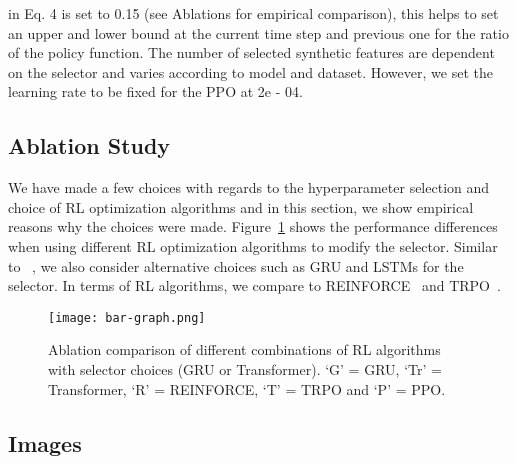 \documentclass[10pt,twocolumn,letterpaper]{article}
\begin{document}
 in Eq. 4 is set to 0.15 (see Ablations for empirical comparison), this helps to set an upper and lower bound at the current time step  and previous one  for the ratio of the policy function. The number of selected synthetic features are dependent on the selector and varies according to model and dataset. However, we set the learning rate to be fixed for the PPO at 2e - 04. 

\subsection{Ablation Study}

We have made a few choices with regards to the hyperparameter selection and choice of RL optimization algorithms and in this section, we show empirical reasons why the choices were made. Figure~\ref{fig:ablation} shows the performance differences when using different RL optimization algorithms to modify the selector. Similar to ~\cite{ye2020synthetic}, we also consider alternative choices such as GRU and LSTMs for the selector. In terms of RL algorithms, we compare to REINFORCE~\cite{reinforce} and TRPO~\cite{trpo}.

\begin{figure}[t]
    \centering
    \texttt{[image: bar-graph.png]}
    \caption{Ablation comparison of different combinations of RL algorithms with selector choices (GRU or Transformer). `G' = GRU, `Tr' = Transformer, `R' = REINFORCE, `T' = TRPO and `P' = PPO.}
    \label{fig:ablation}
\end{figure}

\subsection{Images}
\end{document}
